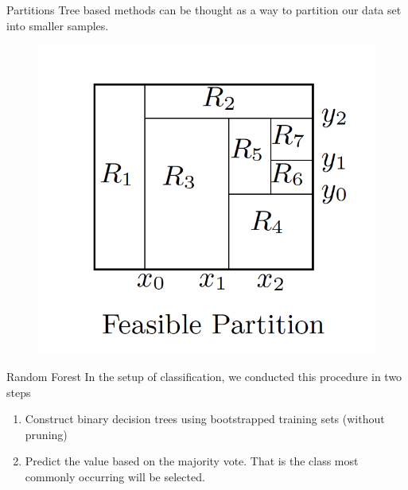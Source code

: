 \documentclass{beamer}
\begin{document}
\begin{frame}{Partitions}
	Tree based methods can be thought as a way to partition our data set into smaller samples.
	
	\begin{figure}[h]
		\centering
		\includegraphics[scale=0.45]{Figures/fig_tree_region.png}
	\end{figure}		

\end{frame}


\begin{frame}{Random Forest}
	In the setup of classification, we conducted this procedure in two steps
	\begin{enumerate}
		\item Construct binary decision trees using bootstrapped training sets (without pruning)
		\item Predict the value based on the majority vote. That is the class most commonly occurring will be selected. 
	\end{enumerate}	


\end{frame}
\end{document}
